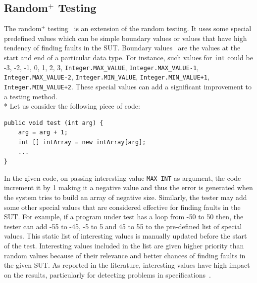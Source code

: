 \subsection{Random$^+$ Testing} \label{subsec:randomPlusTesting}
The random$^+$ testing~\cite{ciupa2007experimental, ciupa2008finding} is an extension of the random testing. It uses some special predefined values which can be simple boundary values or values that have high tendency of finding faults in the SUT. Boundary values~\cite{beizer2003software} are the values at the start and end of a particular data type. For instance, such values for \verb+int+ could be -3, -2, -1, 0, 1, 2, 3, \verb+Integer.MAX_VALUE+, \verb+Integer.MAX_VALUE-1+, \verb+Integer.MAX_VALUE-2+, \verb+Integer.MIN_VALUE+, \verb-Integer.MIN_VALUE+1-, \verb-Integer.MIN_VALUE+2-. These special values can add a significant improvement to a testing method. \\*
Let us consider the following piece of code:
\bigskip
\bigskip
\begin{lstlisting}
public void test (int arg) {
	arg = arg + 1;
	int [] intArray = new intArray[arg];
	...
}
\end{lstlisting}
\bigskip

In the given code, on passing interesting value \verb+MAX_INT+ as argument, the code increment it by 1 making it a negative value and thus the error is generated when the system tries to build an array of negative size. Similarly, the tester may add some other special values that are considered effective for finding faults in the SUT. For example, if a program under test has a loop from -50 to 50 then, the tester can add -55 to -45, -5 to 5 and 45 to 55 to the pre-defined list of special values. This static list of interesting values is manually updated before the start of the test. Interesting values included in the list are given higher priority than random values because of their relevance and better chances of finding faults in the given SUT. As reported in the literature, interesting values have high impact on the results, particularly for detecting problems in specifications~\cite{ciupa2008finding}.


